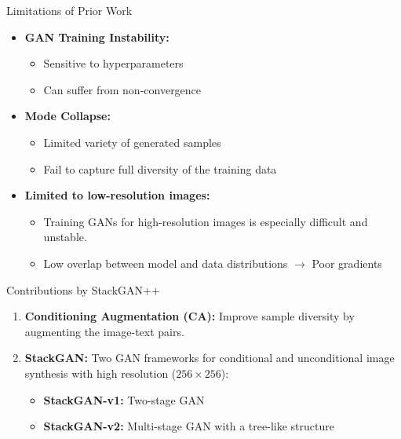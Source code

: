 \documentclass{beamer}
\begin{document}
\begin{frame}{Limitations of Prior Work}
    \begin{itemize}
        \item \textbf{GAN Training Instability:}
        \begin{itemize}
            \item Sensitive to hyperparameters
            \item Can suffer from non-convergence
        \end{itemize}
        \item \textbf{Mode Collapse:}
        \begin{itemize}
            \item Limited variety of generated samples
            \item Fail to capture full diversity of the training data
        \end{itemize}
        \item \textbf{Limited to low-resolution images:}
        \begin{itemize}
            \item Training GANs for high-resolution images is especially difficult and unstable.
            \item Low overlap between model and data distributions $\rightarrow$ Poor gradients %
        \end{itemize}
    \end{itemize}
\end{frame}

\begin{frame}{Contributions by StackGAN++}
    \begin{enumerate}
        \item \textbf{Conditioning Augmentation (CA):} Improve sample diversity by augmenting the image-text pairs.
        \vspace{1em}
        \item \textbf{StackGAN:} Two GAN frameworks for conditional and unconditional image synthesis with high resolution ($256 \times 256$):
        \vspace{0.5em}
        \begin{itemize}
            \item \textbf{StackGAN-v1:} Two-stage GAN
            \vspace{0.25em}
            \item \textbf{StackGAN-v2:} Multi-stage GAN with a tree-like structure
        \end{itemize}
    \end{enumerate}
\end{frame}
\end{document}
